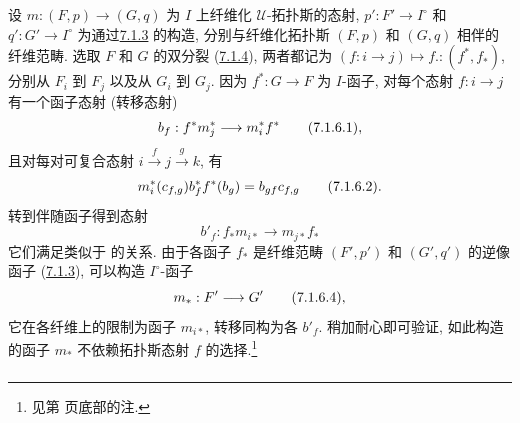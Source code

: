 设 $m:(F,p)\to(G,q)$ 为 $I$ 上纤维化 $𝒰$-拓扑斯的态射,
$p':F'\to I^{\circ}$ 和 $q':G'\to I^{\circ}$
为通过\hyperref[VI.subsubsec7.1.3]{7.1.3} 的构造,
分别与纤维化拓扑斯 $(F,p)$ 和 $(G,q)$ 相伴的纤维范畴.
选取 $F$ 和 $G$ 的双分裂 (\hyperref[VI.subsubsec7.1.4]{7.1.4}),
两者都记为 $(f:i\to j)\mapsto f.:(f^{\ast},f_{\ast})$,
分别从 $F_i$ 到 $F_j$ 以及从 $G_i$ 到 $G_j$.
因为 $f^{\ast}:G\to F$ 为 $I$-函子,
对每个态射 $f:i\to j$ 有一个函子态射 (转移态射)
\begin{equation*}
b_f : f^{\ast}m^{\ast}_j \to m^{\ast}_i f^{\ast}\tag{7.1.6.1}{\quoi},
\end{equation*}
且对每对可复合态射 $i\xrightarrow{f}j\xrightarrow{g}k$, 有
\begin{equation*}
m^{\ast}_i (c_{f, g}) b^{\ast}_f f^{\ast} (b_g) = b_{gf} c_{f, g}\tag{7.1.6.2}{}.
\end{equation*}
转到伴随函子得到态射
\begin{equation*}
b'_f : f_{\ast}m_{i \ast} \to m_{j\ast} f_{\ast}\tag{7.1.6.3}
\end{equation*}
它们满足类似于 的关系.
由于各函子 $f_{\ast}$ 是\pageoriginale 纤维范畴 $(F',p')$ 和 $(G',q')$
的逆像函子 (\hyperref[VI.subsubsec7.1.3]{7.1.3}),
可以构造 $I^{\circ}$-函子
\begin{equation*}
m_{\ast} : F'\to G'\tag{7.1.6.4}{\quoi},
\end{equation*}
它在各纤维上的限制为函子 $m_{i\ast}$, 转移同构为各 $b'_f$.
稍加耐心即可验证, 如此构造的函子 $m_{\ast}$
不依赖拓扑斯态射 $f$ 的选择.\footnote{见第 页底部的注.}

\subsubsection{}

